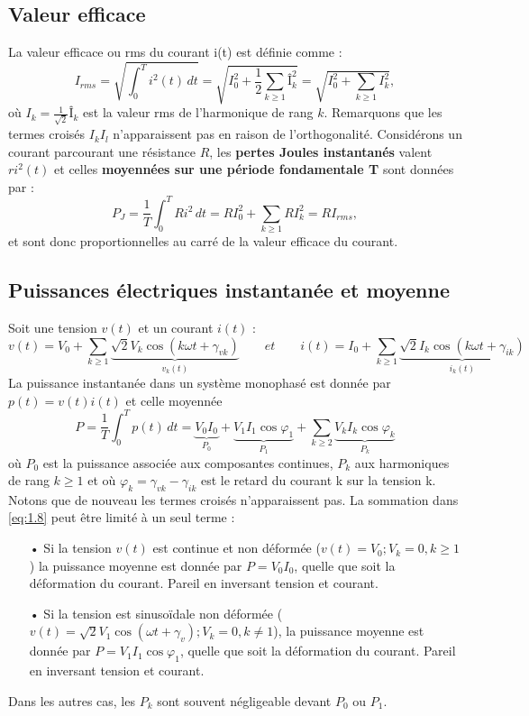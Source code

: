 	\subsection{Valeur efficace}
		La valeur efficace ou rms du courant i(t) est définie comme :
		\begin{equation}
			I_{rms} = \sqrt{\int _0 ^T i^2(t) \, dt} = \sqrt{I_0^2 + \frac{1}{2}\sum _{k\geq 1}Î_k ^2 } = \sqrt{I_0^2 + \sum _{k\geq 1} I_k^2},
		\end{equation}
		où $I_k = \frac{1}{\sqrt{2}}Î_k$ est la valeur rms de l'harmonique de rang $k$. Remarquons que les termes croisés $I_kI_l$ n'apparaissent pas en raison de l'orthogonalité. Considérons un courant parcourant une résistance $R$, les \textbf{pertes Joules instantanés} valent $ri^2(t)$ et celles \textbf{moyennées sur une période fondamentale T} sont données par : 
		\begin{equation}
			P_J = \frac{1}{T}\int _0^T Ri^2 \, dt = RI_0^2 + \sum _{k\geq 1} RI_k^2 = RI_{rms},
		\end{equation}
		et sont donc proportionnelles au carré de la valeur efficace du courant. 
		
	\subsection{Puissances électriques instantanée et moyenne}
		Soit une tension $v(t)$ et un courant $i(t)$ :
		\begin{equation}
			v(t) = V_0 + \sum _{k \geq 1} \underbrace{\sqrt{2} V_k \cos (k\omega t+ \gamma _{vk})}_{v_k(t)} \qquad et \qquad
			i(t) = I_0 + \sum _{k \geq 1} \underbrace{\sqrt{2} I_k \cos (k\omega t+ \gamma _{ik})}_{i_k(t)}
		\end{equation}
		La puissance instantanée dans un système monophasé est donnée par $p(t) = v(t)i(t)$ et celle moyennée 
		\begin{equation}
			P = \frac{1}{T}\int _0 ^T p(t)\, dt = \underbrace{V_0I_0}_{P_0} + \underbrace{V_1I_1\cos \varphi _1}_{P_1} + \sum _{k\geq 2}\underbrace{V_kI_k \cos \varphi _k}_{P_k}
			\label{eq:1.8}
		\end{equation}
		où $P_0$ est la puissance associée aux composantes continues, $P_k$ aux harmoniques de rang $k\geq 1$ et où $\varphi _k = \gamma _{vk} - \gamma _{ik}$ est le retard du courant k sur la tension k. Notons que de nouveau les termes croisés n'apparaissent pas. La sommation dans \eqref{eq:1.8} peut être limité à un seul terme :
		\begin{itemize}
			\item[•] Si la tension $v(t)$ est continue et non déformée ($v(t) = V_0; V_k = 0, k\geq 1$) la puissance moyenne est donnée par $P = V_0I_0$, quelle que soit la déformation du courant. Pareil en inversant tension et courant. 
		 
			\item[•] Si la tension est sinusoïdale non déformée ($v(t) = \sqrt{2}V_1\cos (\omega t + \gamma _v); V_k = 0, k\neq 1$), la puissance moyenne est donnée par $P = V_1I_1\cos \varphi _1$, quelle que soit la déformation du courant. Pareil en inversant tension et courant. 
		\end{itemize}
		Dans les autres cas, les $P_k$ sont souvent négligeable devant $P_0$ ou $P_1$. 
		
